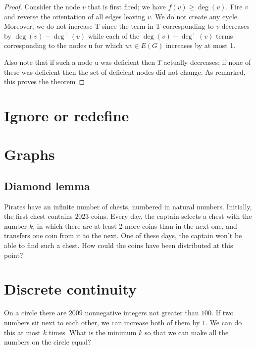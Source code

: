 \begin{proof}
Consider the node $v$ that is first fired; we have $f(v) \geq \deg(v)$. Fire $v$ and reverse the orientation of all edges leaving $v$. We do not create any cycle. Moreover, we do not increase T since the term in T corresponding to $v$ decreases by $\deg(v) − \deg^+(v)$ while each of the $\deg(v) − \deg^+(v)$ terms corresponding to the nodes u for which $uv \in E(G)$ increases by at most 1.

Also note that if such a node u was deficient then $T$ actually decreases; if none of these was deficient then the set of deficient nodes did not change. As remarked, this proves the theorem
\end{proof}


\section{Ignore or redefine}

\begin{example}

\end{example}

\section{Graphs}

\subsection{Diamond lemma}

\begin{example}
    Pirates have an infinite number of chests, numbered in natural numbers. Initially, the first chest contains $2023$ coins. Every day, the captain selects a chest with the number $k$, in which there are at least 2 more coins than in the next one, and transfers one coin from it to the next. One of these days, the captain won't be able to find such a chest. How could the coins have been distributed at this point?
\end{example}

\section{Discrete continuity}

\begin{example}[Russia 2009]
    On a circle there are $2009$ nonnegative integers not greater than $100$. If two numbers sit next to each other, we can increase both of them by $1$. We can do this at most $ k$ times. What is the minimum $ k$ so that we can make all the numbers on the circle equal?
\end{example}

